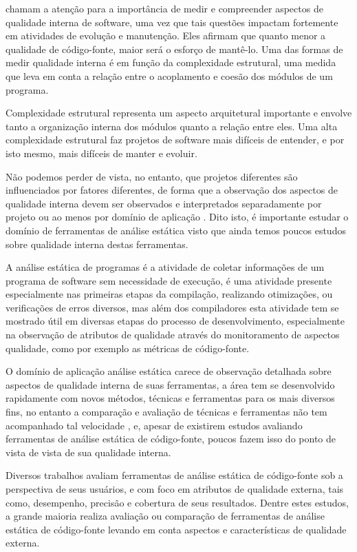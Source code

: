  chamam a atenção para a importância de medir e
compreender aspectos de qualidade interna de software, uma vez que tais
questões impactam fortemente em atividades de evolução e manutenção. Eles
afirmam que quanto menor a qualidade de código-fonte, maior será o esforço de
mantê-lo. Uma das formas de medir qualidade interna é em função da
complexidade estrutural, uma medida que leva em conta a relação entre o
acoplamento e coesão dos módulos de um programa.

Complexidade estrutural representa um aspecto arquitetural importante e envolve
tanto a organização interna dos módulos quanto a relação entre eles. Uma alta
complexidade estrutural faz projetos de software mais difíceis de entender, e
por isto mesmo, mais difíceis de manter e evoluir.

Não podemos perder de vista, no entanto, que projetos diferentes são
influenciados por fatores diferentes, de forma que a observação dos aspectos
de qualidade interna devem ser observados e interpretados separadamente por
projeto \cite{Terceiro2012Understanding} ou ao menos por domínio de
aplicação \cite{Meirelles2013}. Dito isto, é importante estudar o domínio
de ferramentas de análise estática visto que ainda temos poucos estudos
sobre qualidade interna destas ferramentas.

A análise estática de programas é a atividade de coletar informações de um
programa de software sem necessidade de execução, é uma atividade presente
especialmente nas primeiras etapas da compilação, realizando otimizações, ou
verificações de erros diversos, mas além dos compiladores esta atividade tem
se mostrado útil em diversas etapas do processo de desenvolvimento,
especialmente na observação de atributos de qualidade através do monitoramento
de aspectos qualidade, como por exemplo as métricas de código-fonte.

O domínio de aplicação análise estática carece de observação
detalhada sobre aspectos de qualidade interna de suas ferramentas, a
área tem se desenvolvido rapidamente com novos métodos, técnicas e ferramentas
para os mais diversos fins, no entanto a comparação e avaliação de técnicas e ferramentas
não tem acompanhado tal velocidade \cite{Li2010}, e, apesar de existirem
estudos avaliando ferramentas de análise estática de código-fonte, poucos
fazem isso do ponto de vista de vista de sua qualidade interna.

Diversos trabalhos avaliam ferramentas de análise estática de código-fonte sob
a perspectiva de seus usuários, e com foco em atributos de qualidade externa,
tais como, desempenho, precisão e cobertura de seus resultados. Dentre estes
estudos, a grande maioria realiza avaliação ou comparação de ferramentas de
análise estática de código-fonte levando em conta aspectos e características de
qualidade externa.

